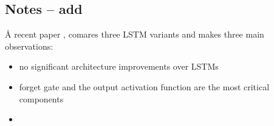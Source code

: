 \subsection{Notes -- add}

\r{A recent paper , comares three LSTM variants and makes three main observations:}

\begin{itemize}[noitemsep,topsep=0pt]
	\item no significant architecture improvements over LSTMs
	\item forget gate and the output activation function are the most critical components
	\item {}
\end{itemize}










